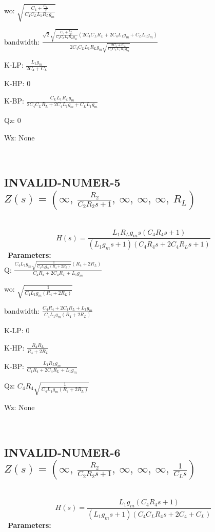 \documentclass{article}
\begin{document}
wo: $\sqrt{\frac{C_{4} + \frac{C_{L}}{2}}{C_{4} C_{L} L_{1} R_{L} g_{m}}}$\ 

bandwidth: $\frac{\sqrt{2} \sqrt{\frac{C_{4} + \frac{C_{L}}{2}}{C_{4} C_{L} L_{1} R_{L} g_{m}}} \left(2 C_{4} C_{L} R_{L} + 2 C_{4} L_{1} g_{m} + C_{L} L_{1} g_{m}\right)}{2 C_{4} C_{L} L_{1} R_{L} g_{m} \sqrt{\frac{2 C_{4} + C_{L}}{C_{4} C_{L} L_{1} R_{L} g_{m}}}}$\ 

K-LP: $\frac{L_{1} g_{m}}{2 C_{4} + C_{L}}$\ 

K-HP: $0$\ 

K-BP: $\frac{C_{L} L_{1} R_{L} g_{m}}{2 C_{4} C_{L} R_{L} + 2 C_{4} L_{1} g_{m} + C_{L} L_{1} g_{m}}$\ 

Qz: $0$\ 

Wz: $\text{None}$\ 

\ 

\subsection{INVALID-NUMER-5 $Z(s) = \left( \infty, \  \frac{R_{2}}{C_{2} R_{2} s + 1}, \  \infty, \  \infty, \  \infty, \  R_{L}\right)$ } \ 
\textbf{\[H(s) = \frac{L_{1} R_{L} g_{m} s \left(C_{4} R_{4} s + 1\right)}{\left(L_{1} g_{m} s + 1\right) \left(C_{4} R_{4} s + 2 C_{4} R_{L} s + 1\right)}\] } \ 
\textbf{Parameters:}\\ 

Q: $\frac{C_{4} L_{1} g_{m} \sqrt{\frac{1}{C_{4} L_{1} g_{m} \left(R_{4} + 2 R_{L}\right)}} \left(R_{4} + 2 R_{L}\right)}{C_{4} R_{4} + 2 C_{4} R_{L} + L_{1} g_{m}}$\ 

wo: $\sqrt{\frac{1}{C_{4} L_{1} g_{m} \left(R_{4} + 2 R_{L}\right)}}$\ 

bandwidth: $\frac{C_{4} R_{4} + 2 C_{4} R_{L} + L_{1} g_{m}}{C_{4} L_{1} g_{m} \left(R_{4} + 2 R_{L}\right)}$\ 

K-LP: $0$\ 

K-HP: $\frac{R_{4} R_{L}}{R_{4} + 2 R_{L}}$\ 

K-BP: $\frac{L_{1} R_{L} g_{m}}{C_{4} R_{4} + 2 C_{4} R_{L} + L_{1} g_{m}}$\ 

Qz: $C_{4} R_{4} \sqrt{\frac{1}{C_{4} L_{1} g_{m} \left(R_{4} + 2 R_{L}\right)}}$\ 

Wz: $\text{None}$\ 

\ 

\subsection{INVALID-NUMER-6 $Z(s) = \left( \infty, \  \frac{R_{2}}{C_{2} R_{2} s + 1}, \  \infty, \  \infty, \  \infty, \  \frac{1}{C_{L} s}\right)$ } \ 
\textbf{\[H(s) = \frac{L_{1} g_{m} \left(C_{4} R_{4} s + 1\right)}{\left(L_{1} g_{m} s + 1\right) \left(C_{4} C_{L} R_{4} s + 2 C_{4} + C_{L}\right)}\] } \ 
\textbf{Parameters:}\\ 
\end{document}

